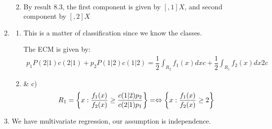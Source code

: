 \begin{enumerate}[label=\arabic*.,leftmargin=*]
\begin{enumerate}[label=\alph*),leftmargin=*]
\begin{equation*}
\begin{gathered}
        \end{gathered}
      \end{equation*}
      \par\bigskip
    \item By result 8.3, the first component is given by $[,1]X$, and second component by $[,2]X$
  \end{enumerate}
  \par\bigskip
  \item 
  \begin{enumerate}[label=\alph*),leftmargin=*]
    \item This is a matter of classification since we know the classes.\par
      \noindent The ECM is given by:
      \begin{equation*}
        \begin{gathered}
          p_1P(2|1)c(2|1)+p_2P(1|2)c(1|2) = \dfrac{1}{2}\int_{R_2}f_1(x)dx c + \dfrac{1}{2}\int_{R_1}f_2(x)dx 2c
        \end{gathered}
      \end{equation*}
    \item\& c) 
      \begin{equation*}
        \begin{gathered}
          R_1 = \left\{x:\dfrac{f_1(x)}{f_2(x)}\geq \dfrac{c(1|2)p_2}{c(2|1)p_1}\right\} = \Leftrightarrow \left\{x:\dfrac{f_1(x)}{f_2(x)}\geq2\right\}
        \end{gathered}
      \end{equation*}
  \end{enumerate}
  \par\bigskip
  \setcounter{enumi}{7}
\item We have multivariate regression, our assumption is independence. 
\end{enumerate}
